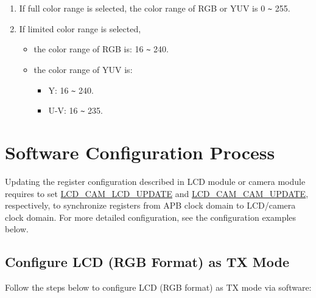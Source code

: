 \documentclass[main\_\_EN.tex]{subfiles}
\begin{document}
\begin{tiplisting}
\vspace{-2em}
\begin{enumerate}
    \item \label{full-color-range-note} If full color range is selected, the color range of RGB or YUV is 0 \verb+~+ 255.
    \item \label{limited-color-range-note} If limited color range is selected,
    \begin{itemize}
    \item the color range of RGB is: 16 \verb+~+ 240.
    \item the color range of YUV is:
    \begin{itemize}
        \item Y: 16 \verb+~+ 240.
        \item U-V: 16 \verb+~+ 235.
    \end{itemize}
    \end{itemize}
\end{enumerate}
\end{tiplisting}

\section{Software Configuration Process}
\begin{tiplisting}
Updating the register configuration described in LCD module or camera module requires to set \hyperref[fielddesc:LCDCAMLCDUPDATE]{LCD\_CAM\_LCD\_UPDATE} and \hyperref[fielddesc:LCDCAMCAMUPDATE]{LCD\_CAM\_CAM\_UPDATE}, respectively, to synchronize registers from APB clock domain to LCD/camera clock domain. For more detailed configuration, see the configuration examples below.
\end{tiplisting}
\vspace{-2em}

\subsection{Configure LCD (RGB Format) as TX Mode}
Follow the steps below to configure LCD (RGB format) as TX mode via software:
\end{document}

